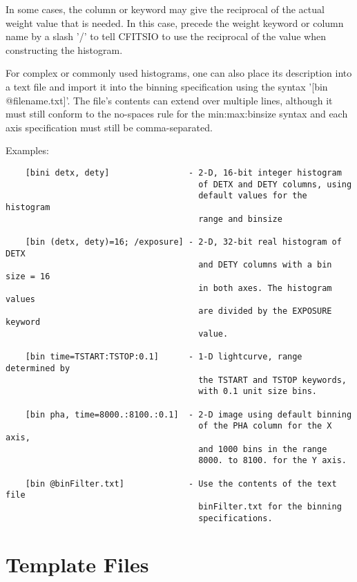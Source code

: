 \documentclass[11pt]{book}
\begin{document}
In some cases, the column or keyword may give the reciprocal of the
actual weight value that is needed.  In this case, precede the weight
keyword or column name by a slash '/' to tell CFITSIO to use the
reciprocal of the value when constructing the histogram.

For  complex or commonly  used  histograms, one  can also  place its
description  into  a  text  file and  import   it  into  the binning
specification  using the  syntax '[bin  @filename.txt]'.  The
file's contents  can extend over   multiple lines, although  it must
still conform to the  no-spaces rule  for the min:max:binsize syntax
and each axis specification must still be comma-separated.

 Examples:


\begin{verbatim}
    [bini detx, dety]                - 2-D, 16-bit integer histogram
                                       of DETX and DETY columns, using
                                       default values for the histogram
                                       range and binsize

    [bin (detx, dety)=16; /exposure] - 2-D, 32-bit real histogram of DETX
                                       and DETY columns with a bin size = 16
                                       in both axes. The histogram values
                                       are divided by the EXPOSURE keyword
                                       value.

    [bin time=TSTART:TSTOP:0.1]      - 1-D lightcurve, range determined by
                                       the TSTART and TSTOP keywords,
                                       with 0.1 unit size bins.

    [bin pha, time=8000.:8100.:0.1]  - 2-D image using default binning
                                       of the PHA column for the X axis,
                                       and 1000 bins in the range
                                       8000. to 8100. for the Y axis.

    [bin @binFilter.txt]             - Use the contents of the text file
                                       binFilter.txt for the binning
                                       specifications.

\end{verbatim}


\chapter{Template Files }
\end{document}
